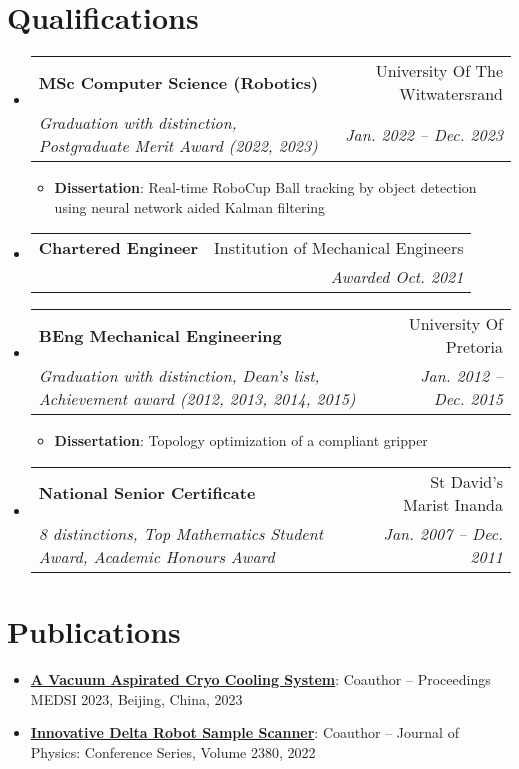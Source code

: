 \documentclass[letterpaper,11pt]{article}
\makeatletter
\newcommand{\resumeItem}[2]{
  \item\small{
    \textbf{#1}{: #2 \vspace{-2pt}}
  }
}
\newcommand{\resumeSubheading}[4]{
  \vspace{-1pt}\item
    \begin{tabular*}{0.97\textwidth}[t]{l@{\extracolsep{\fill}}r}
      \textbf{#1} & #2 \\
      \textit{\small#3} & \textit{\small #4} \\
    \end{tabular*}\vspace{-5pt}
}
\newcommand{\resumeSubItem}[2]{\resumeItem{#1}{#2}\vspace{-4pt}}
\newcommand{\resumeSubHeadingListStart}{\begin{itemize}[leftmargin=*]}
\newcommand{\resumeSubHeadingListEnd}{\end{itemize}}
\makeatother
\begin{document}
\section{Qualifications}
  \resumeSubHeadingListStart
    \resumeSubheading
      {MSc Computer Science (Robotics)} {University Of The Witwatersrand}
      {Graduation with distinction, Postgraduate Merit Award (2022, 2023)}{Jan. 2022 -- Dec. 2023}
        \resumeSubHeadingListStart
			\resumeSubItem{Dissertation}
      		{Real-time RoboCup Ball tracking by object detection using neural network aided Kalman filtering}
		\resumeSubHeadingListEnd
    \resumeSubheading
      {Chartered Engineer} {Institution of Mechanical Engineers}
      {}{Awarded Oct. 2021}
    \resumeSubheading
      {BEng Mechanical Engineering}{University Of Pretoria}
      {Graduation with distinction, Dean's list, Achievement award (2012, 2013, 2014, 2015)}{Jan. 2012 -- Dec. 2015}
    	\resumeSubHeadingListStart
			\resumeSubItem{Dissertation}
      		{Topology optimization of a compliant gripper}
		\resumeSubHeadingListEnd
     \resumeSubheading
      {National Senior Certificate}{St David’s Marist Inanda}
      {8 distinctions, Top Mathematics Student Award, Academic Honours Award}{Jan. 2007 -- Dec. 2011}
  \resumeSubHeadingListEnd


\section{Publications}
  \resumeSubHeadingListStart
    \resumeSubItem{\href{https://accelconf.web.cern.ch/medsi2023/papers/weoam02.pdf}{A Vacuum Aspirated Cryo Cooling System}}
      {Coauthor -- Proceedings MEDSI 2023, Beijing, China, 2023}
    \resumeSubItem{\href{https://iopscience.iop.org/article/10.1088/1742-6596/2380/1/012113/pdf}{Innovative Delta Robot Sample Scanner}}
      {Coauthor -- Journal of Physics: Conference Series, Volume 2380, 2022}
  \resumeSubHeadingListEnd

%


\end{document}
